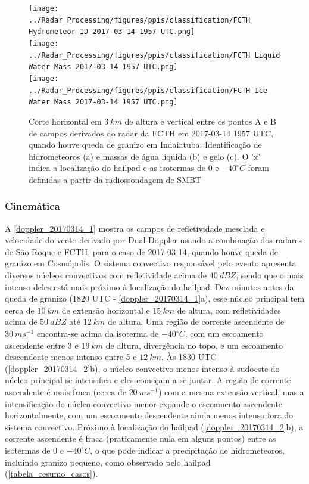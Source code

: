 \begin{figure}[htb]
	\centering
	\caption{Corte horizontal em $3\:km$ de altura e vertical entre os pontos A e B de campos derivados do radar da FCTH em 2017-03-14 1957 UTC, quando houve queda de granizo em Indaiatuba: Identificação de hidrometeoros (a) e massas de água líquida (b) e gelo (c). O 'x' indica a localização do hailpad e as isotermas de $0$ e $-40^{\circ}C$ foram definidas a partir da radiossondagem de SMBT} 
	\label{radar_derived_20170314_2}
	\vspace{-5pt}
	\texttt{[image: ../Radar\_Processing/figures/ppis/classification/FCTH Hydrometeor ID 2017-03-14 1957 UTC.png]} \\
	\vspace{-5pt}
	\texttt{[image: ../Radar\_Processing/figures/ppis/classification/FCTH Liquid Water Mass 2017-03-14 1957 UTC.png]} \\
	\vspace{-5pt}
	\texttt{[image: ../Radar\_Processing/figures/ppis/classification/FCTH Ice Water Mass 2017-03-14 1957 UTC.png]} \\
\end{figure}

\pagebreak

\subsubsection{Cinemática}\label{cinematica_201703014}

A \autoref{doppler_20170314_1} mostra os campos de refletividade mesclada e velocidade do vento derivado por Dual-Doppler usando a combinação dos radares de São Roque e FCTH, para o caso de 2017-03-14, quando houve queda de granizo em Cosmópolis. O sistema convectivo responsável pelo evento apresenta diversos núcleos convectivos com refletividade acima de $40\:dBZ$, sendo que o mais intenso deles está mais próximo à localização do hailpad. Dez minutos antes da queda de granizo (1820 UTC - \autoref{doppler_20170314_1}a), esse núcleo principal tem cerca de $10\:km$ de extensão horizontal e $15\:km$ de altura, com refletividades acima de $50\:dBZ$ até $12\:km$ de altura. Uma região de corrente ascendente de $30\:ms^{-1}$ encontra-se acima da isoterma de $-40^{\circ}C$, com um escoamento ascendente entre 3 e $19\:km$ de altura, divergência no topo, e um escoamento descendente menos intenso entre 5 e $12\:km$. Às 1830 UTC (\autoref{doppler_20170314_2}b), o núcleo convectivo menos intenso à sudoeste do núcleo principal se intensifica e eles começam a se juntar. A região de corrente ascendente é mais fraca (cerca de $20\:ms^{-1}$) com a mesma extensão vertical, mas a intensificação do núcleo convectivo menor expande o escoamento ascendente horizontalmente, com um escoamento descendente ainda menos intenso fora do sistema convectivo. Próximo à localização do hailpad (\autoref{doppler_20170314_2}b), a corrente ascendente é fraca (praticamente nula em alguns pontos) entre as isotermas de 0 e $-40^{\circ}C$, o que pode indicar a precipitação de hidrometeoros, incluindo granizo pequeno, como observado pelo hailpad (\autoref{tabela_resumo_casos}).

